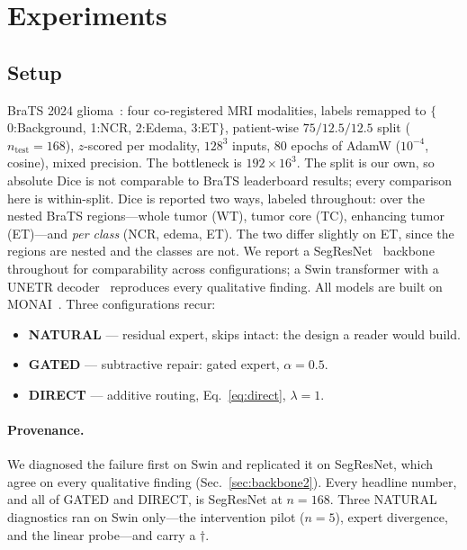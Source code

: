 \section{Experiments}
\label{sec:experiments}

\subsection{Setup}
BraTS 2024 glioma~\cite{menze2014brats,baid2021brats}: four co-registered MRI modalities, labels
remapped to $\{$0:Background, 1:NCR, 2:Edema, 3:ET$\}$, patient-wise $75/12.5/12.5$ split
($n_{\text{test}}{=}168$), $z$-scored per modality, $128^3$ inputs, $80$ epochs of AdamW
($10^{-4}$, cosine), mixed precision. The bottleneck is $192\times16^3$. The split is our own, so absolute Dice is not comparable to BraTS leaderboard results; every
comparison here is within-split. Dice is reported two ways, labeled throughout: over
the nested BraTS regions---whole tumor (WT), tumor core (TC), enhancing tumor (ET)---and
\emph{per class} (NCR, edema, ET). The two differ slightly on ET, since the regions are nested and
the classes are not. We report a
SegResNet~\cite{myronenko2018segresnet} backbone throughout for comparability across
configurations; a Swin transformer with a UNETR decoder~\cite{hatamizadeh2021swinunetr}
reproduces every qualitative finding. All models are built on MONAI~\cite{cardoso2022monai}. Three configurations recur:

\begin{itemize}\itemsep1pt
\item[] \textbf{NATURAL} --- residual expert, skips intact: the design a reader would build.
\item[] \textbf{GATED} --- subtractive repair: gated expert, $\alpha{=}0.5$.
\item[] \textbf{DIRECT} --- additive routing, Eq.~\ref{eq:direct}, $\lambda{=}1$.
\end{itemize}

\paragraph{Provenance.}
We diagnosed the failure first on Swin and replicated it on SegResNet, which agree on every
qualitative finding (Sec.~\ref{sec:backbone2}). Every headline number, and all of GATED and DIRECT,
is SegResNet at $n{=}168$. Three NATURAL diagnostics ran on Swin only---the intervention pilot
($n{=}5$), expert divergence, and the linear probe---and carry a $\dagger$.


